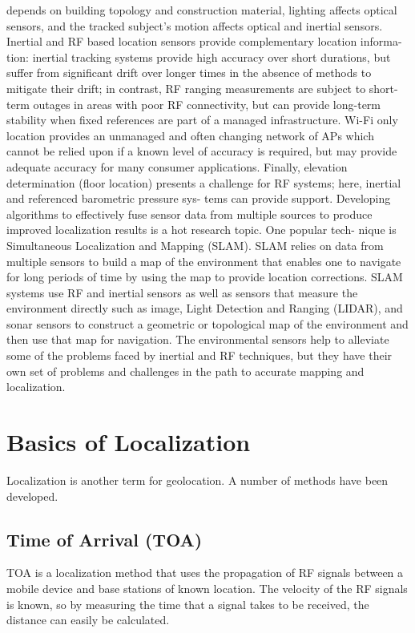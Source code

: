 depends on building topology and construction material, lighting affects optical
sensors, and the tracked subject’s motion affects optical and inertial sensors.
Inertial and RF based location sensors provide complementary location informa-
tion: inertial tracking systems provide high accuracy over short durations, but
suffer from significant drift over longer times in the absence of methods to mitigate
their drift; in contrast, RF ranging measurements are subject to short-term outages
in areas with poor RF connectivity, but can provide long-term stability when fixed
references are part of a managed infrastructure. Wi-Fi only location provides an
unmanaged and often changing network of APs which cannot be relied upon if a
known level of accuracy is required, but may provide adequate accuracy for many
consumer applications. Finally, elevation determination (floor location) presents a
challenge for RF systems; here, inertial and referenced barometric pressure sys-
tems can provide support.
Developing algorithms to effectively fuse sensor data from multiple sources to
produce improved localization results is a hot research topic. One popular tech-
nique is Simultaneous Localization and Mapping (SLAM). SLAM relies on data
from multiple sensors to build a map of the environment that enables one to
navigate for long periods of time by using the map to provide location corrections.
SLAM systems use RF and inertial sensors as well as sensors that measure the
environment directly such as image, Light Detection and Ranging (LIDAR), and
sonar sensors to construct a geometric or topological map of the environment and
then use that map for navigation. The environmental sensors help to alleviate some
of the problems faced by inertial and RF techniques, but they have their own set of
problems and challenges in the path to accurate mapping and localization.




\section{Basics of Localization}

Localization is another term for geolocation. A number of methods have been developed.

\subsection{Time of Arrival (TOA)}

TOA is a localization method that uses the propagation of RF signals between a mobile device and base stations of known location. The velocity of the RF signals is known, so by measuring the time that a signal takes to be received, the distance can easily be calculated. 

